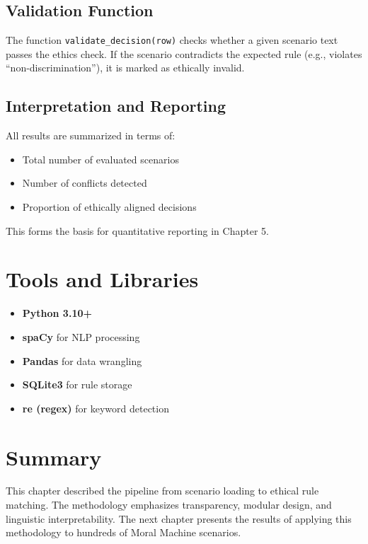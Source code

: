 \subsection{Validation Function}

The function \texttt{validate\_decision(row)} checks whether a given scenario text passes the ethics check. If the scenario contradicts the expected rule (e.g., violates ``non-discrimination''), it is marked as ethically invalid.

\subsection{Interpretation and Reporting}

All results are summarized in terms of:
\begin{itemize}
    \item Total number of evaluated scenarios
    \item Number of conflicts detected
    \item Proportion of ethically aligned decisions
\end{itemize}

This forms the basis for quantitative reporting in Chapter 5.

\section{Tools and Libraries}

\begin{itemize}
    \item \textbf{Python 3.10+}
    \item \textbf{spaCy} for NLP processing
    \item \textbf{Pandas} for data wrangling
    \item \textbf{SQLite3} for rule storage
    \item \textbf{re (regex)} for keyword detection
\end{itemize}

\section{Summary}

This chapter described the pipeline from scenario loading to ethical rule matching. The methodology emphasizes transparency, modular design, and linguistic interpretability. The next chapter presents the results of applying this methodology to hundreds of Moral Machine scenarios.

